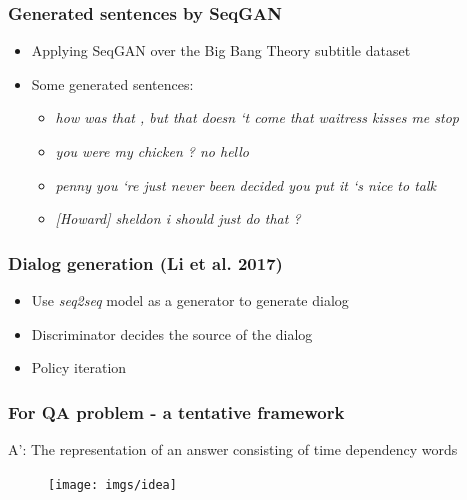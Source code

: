 \documentclass{beamer}
\begin{document}
\begin{frame}
\frametitle{Generated sentences by SeqGAN}
\begin{itemize}
\item Applying SeqGAN over the Big Bang Theory subtitle dataset
\item Some generated sentences:
	\begin{itemize}
		\item \emph{how was that , but that doesn `t come that waitress kisses me stop}
		\item \emph{you were my chicken ? no hello} 
		\item \emph{penny you `re just never been decided you put it `s nice to talk}
		\item \emph{{{[Howard]}} sheldon i should just do that ?}

	\end{itemize}
\end{itemize}
\end{frame}


\begin{frame}
\frametitle{Dialog generation (Li et al. 2017)}
\begin{itemize}
\item Use \emph{seq2seq} model as a generator to generate dialog
\item Discriminator decides the source of the dialog
\item Policy iteration
\end{itemize}
\end{frame}

\begin{frame}
\frametitle{For QA problem - a tentative framework}
A': The representation of an answer consisting of time dependency words

 	\begin{figure}
			\centering
			\hspace{-1cm}\texttt{[image: imgs/idea]}
	\end{figure}
\end{frame}
\end{document}

